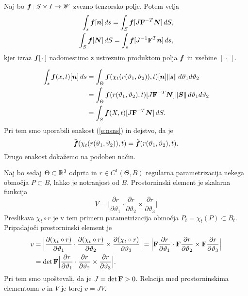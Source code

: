 \begin{izrek} \label{i:suittra}
	Naj bo $\boldsymbol f\colon S\times I\to\mathscr W$ zvezno tenzorsko polje. Potem velja
	\begin{align*}
		\int_s\boldsymbol f[\boldsymbol n]\,ds=\int_S\boldsymbol f[J\mathbf F^{-T}\boldsymbol N]\,dS ,\\
		\int_S\boldsymbol f[\boldsymbol N]\,dS=\int_s\boldsymbol f[J^{-1}\mathbf F^{T}\boldsymbol n]\,ds,
	\end{align*}
	kjer izraz $\boldsymbol f[\,\cdot\,]$ nadomestimo z ustreznim produktom
	polja $\boldsymbol f$ in vsebine $[\,\cdot\,]$.
\end{izrek}

\proof
	\begin{align*}
		\int_s\boldsymbol f(x,t)[\boldsymbol n]\,ds&=
		\int_{\Theta}\boldsymbol f(\chi_t(r(\vartheta_1,\vartheta_2)),t)
		[\boldsymbol n]\|\boldsymbol s\|\,d\vartheta_1d\vartheta_2\\
		&=\int_{\Theta}\boldsymbol f(r(\vartheta_1,\vartheta_2),t)
		[J\mathbf F^{-T}\boldsymbol N]\|\boldsymbol S\|\,d\vartheta_1d\vartheta_2\\
		&=\int_S\boldsymbol f(X,t)[J\mathbf F^{-T}\boldsymbol N]\,dS.
	\end{align*}
	Pri tem smo uporabili enakost (\ref{e:nsns}) in dejstvo, da je
	\[ \bar{\boldsymbol f}(\chi_t(r(\vartheta_1,\vartheta_2)),t)=\hat{\boldsymbol f}(r(\vartheta_1,\vartheta_2),t). \]
	Drugo enakost dokažemo na podoben način.
\endproof

Naj bo sedaj $\Theta\subset\mathbb R^3$ odprta in $r\in C^1(\Theta,B)$ regularna parametrizacija
nekega območja $P\subset B$, lahko je notranjost od $B$. Prostorninski element je
skalarna funkcija
\[
	V=\Big|\frac{\partial r}{\partial\vartheta_1}\cdot
	\frac{\partial r}{\partial\vartheta_2}\times\frac{\partial r}{\partial\vartheta_3}\Big|
\]
Preslikava $\chi_t\circ r$ je v tem primeru parametrizacija območja $P_t=\chi_t(P)\subset B_t$.
Pripadajoči prostorninski element je
\begin{align*}
	v&=\Big|\frac{\partial(\chi_t\circ r)}{\partial\vartheta_1}\cdot
	\frac{\partial(\chi_t\circ r)}{\partial\vartheta_2}\times\frac{\partial(\chi_t\circ r)}{\partial\vartheta_3}\Big|
	=\Big|\mathbf F\frac{\partial r}{\partial\vartheta_1}\cdot
	\mathbf F\frac{\partial r}{\partial\vartheta_2}\times\mathbf F\frac{\partial r}{\partial\vartheta_3}\Big| \\
	&=\det\mathbf F\Big|\frac{\partial r}{\partial\vartheta_1}\cdot
	\frac{\partial r}{\partial\vartheta_2}\times\frac{\partial r}{\partial\vartheta_3}\Big|.
\end{align*}
Pri tem smo upoštevali, da je $J=\det\mathbf F>0$.
Relacija med prostorninskima elementoma $v$ in $V$ je torej $v=JV$.


